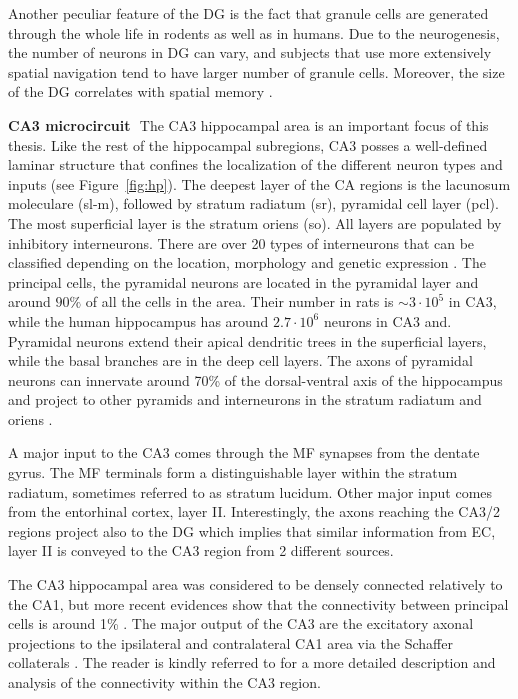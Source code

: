     Another peculiar feature of the DG is the fact that granule cells are
    generated through the whole life in rodents as well as in humans. Due to
    the neurogenesis, the number of neurons in DG can vary, and subjects that
    use more extensively spatial navigation tend to have larger number of
    granule cells. Moreover, the size of the DG correlates with spatial memory
    \citep{Maguire2000, Spalding2013}.

    \textbf{CA3 microcircuit}\,\,
    The CA3 hippocampal area is an important focus of this thesis. Like the
    rest of the hippocampal subregions, CA3 posses a well-defined laminar
    structure that confines the localization of the different neuron types and
    inputs (see Figure~\ref{fig:hp}). The deepest layer of the CA regions is
    the lacunosum moleculare (sl-m), followed by stratum radiatum (sr),
    pyramidal cell layer (pcl). The most superficial layer is the stratum
    oriens (so). All layers are populated by inhibitory interneurons. There are
    over 20 types of interneurons that can be classified depending on the
    location, morphology and genetic expression \citep{Maccaferri2003,
    Klausberger2008}. The principal cells, the pyramidal neurons are located in
    the pyramidal layer and around $90\%$ of all the cells in the area. Their
    number in rats is $\sim 3 \cdot 10^5$ \citep{Boss1985, Boss1987} in CA3,
    while the human hippocampus has around $2.7 \cdot 10^6$ neurons in CA3 and.
    Pyramidal neurons extend their apical dendritic trees in the superficial
    layers, while the basal branches are in the deep cell layers. The axons of
    pyramidal neurons can innervate around 70\% of the dorsal-ventral axis of
    the hippocampus and project to other pyramids and interneurons in the
    stratum radiatum and oriens \citep{Sik1993, Li1994}.

    A major input to the CA3 comes through the MF synapses from the dentate
    gyrus. The MF terminals form a distinguishable layer within the stratum
    radiatum, sometimes referred to as stratum lucidum. Other major input comes
    from the entorhinal cortex, layer II. Interestingly, the axons reaching the
    CA3/2 regions project also to the DG which implies that similar information
    from EC, layer II is conveyed to the CA3 region from 2 different sources.

    The CA3 hippocampal area was considered to be densely connected 
    \cite[$\sim3 \% $ in][]{Miles1986} relatively to the CA1, but more recent evidences show that %
    the connectivity between principal cells is around 1\% \citep{Guzman2016}.
    The major output of the CA3 are the excitatory axonal projections to the
    ipsilateral and contralateral CA1 area via the Schaffer collaterals
    \citep{Finnerty1993}. The reader is kindly referred to \cite{Duigou2014} for a
    more detailed description and analysis of the connectivity within the
    CA3 region.

